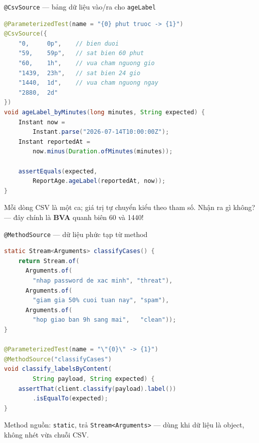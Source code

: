 \documentclass[aspectratio=169,12pt]{beamer}
\begin{document}
\begin{frame}[fragile,shrink=8]{\texttt{@CsvSource} --- bảng dữ liệu vào/ra cho \texttt{ageLabel}}
\begin{lstlisting}[language=java]
@ParameterizedTest(name = "{0} phut truoc -> {1}")
@CsvSource({
    "0,     0p",    // bien duoi
    "59,    59p",   // sat bien 60 phut
    "60,    1h",    // vua cham nguong gio
    "1439,  23h",   // sat bien 24 gio
    "1440,  1d",    // vua cham nguong ngay
    "2880,  2d"
})
void ageLabel_byMinutes(long minutes, String expected) {
    Instant now =
        Instant.parse("2026-07-14T10:00:00Z");
    Instant reportedAt =
        now.minus(Duration.ofMinutes(minutes));

    assertEquals(expected,
        ReportAge.ageLabel(reportedAt, now));
}
\end{lstlisting}
  \vspace{-0.3em}
  {\small Mỗi dòng CSV là một ca; giá trị tự chuyển kiểu theo tham số.
  Nhận ra gì không? --- đây chính là \textbf{BVA} quanh biên 60 và 1440!}
\end{frame}

\begin{frame}[fragile,shrink=8]{\texttt{@MethodSource} --- dữ liệu phức tạp từ method}
\begin{lstlisting}[language=java]
static Stream<Arguments> classifyCases() {
    return Stream.of(
      Arguments.of(
        "nhap password de xac minh", "threat"),
      Arguments.of(
        "giam gia 50% cuoi tuan nay", "spam"),
      Arguments.of(
        "hop giao ban 9h sang mai",   "clean"));
}

@ParameterizedTest(name = "\"{0}\" -> {1}")
@MethodSource("classifyCases")
void classify_labelsByContent(
        String payload, String expected) {
    assertThat(client.classify(payload).label())
        .isEqualTo(expected);
}
\end{lstlisting}
  \vspace{-0.3em}
  {\small Method nguồn: \texttt{static}, trả \texttt{Stream<Arguments>} ---
  dùng khi dữ liệu là object, không nhét vừa chuỗi CSV.}
\end{frame}
\end{document}
